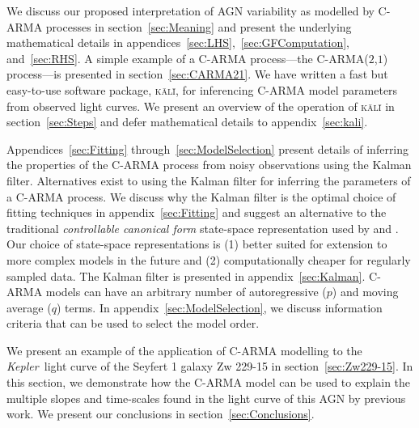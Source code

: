 \documentclass[a4paper,fleqn,usenatbib]{mnras}
\newcommand{\Kepler}{\textit{Kepler~}}
\begin{document}
We discuss our proposed interpretation of AGN variability as modelled by C-ARMA processes in section~\ref{sec:Meaning} and present the underlying mathematical details in appendices~\ref{sec:LHS},~\ref{sec:GFComputation}, and~\ref{sec:RHS}. A simple example of a C-ARMA process---the C-ARMA($2$,$1$) process---is presented in section~\ref{sec:CARMA21}. We have written a fast but easy-to-use software package, \textsc{k\={a}l\={i}}, for inferencing C-ARMA model parameters from observed light curves. We present an overview of the operation of \textsc{k\={a}l\={i}} in section~\ref{sec:Steps} and defer mathematical details to appendix~\ref{sec:kali}.

Appendices~\ref{sec:Fitting} through~\ref{sec:ModelSelection} present details of inferring the properties of the C-ARMA process from noisy observations using the Kalman filter. Alternatives exist to using the Kalman filter for inferring the parameters of a C-ARMA process. We discuss why the Kalman filter is the optimal choice of fitting techniques in appendix~\ref{sec:Fitting}
and suggest an alternative to the traditional \textit{controllable canonical form} state-space representation used by \citet{JonesAckerson90} and \citet{Brockwell14}. Our choice of state-space representations is (1) better suited for extension to more complex models in the future and (2) computationally cheaper for regularly sampled data. The Kalman filter is presented in appendix~\ref{sec:Kalman}. C-ARMA models can have an arbitrary number of autoregressive ($p$) and moving average ($q$) terms. In appendix~\ref{sec:ModelSelection}, we discuss information criteria that can be used to select the model order.

We present an example of the application of C-ARMA modelling to the \Kepler light curve of the Seyfert 1 galaxy Zw 229-15 in section~\ref{sec:Zw229-15}. In this section, we demonstrate how the C-ARMA model can be used to explain the multiple slopes and time-scales found in the light curve of this AGN by previous work. We present our conclusions in section~\ref{sec:Conclusions}.
\end{document}
